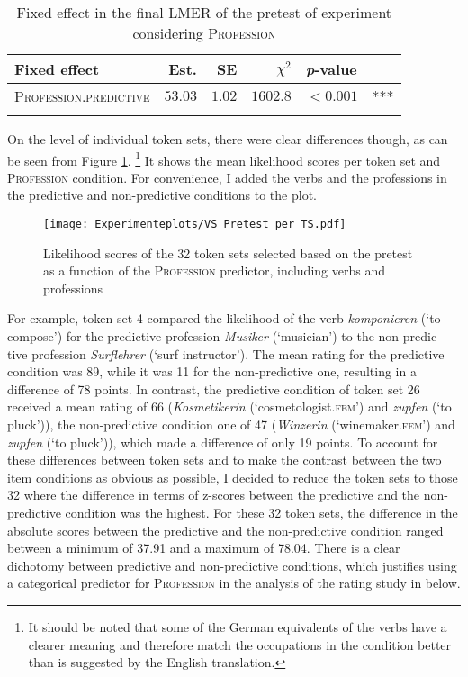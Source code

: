 \begin{table}
\caption{Fixed effect in the final LMER of the pretest of experiment  considering  \textsc{Profession}}
\centering
\begin{tabular}{lrrrll}
\lsptoprule
Fixed effect & Est. & SE & $\chi^2$ & \textit{p}-value &   \\
\midrule
\textsc{Profession.predictive} & $53.03$ & $1.02$ & $1602.8$ & $< 0.001$ & ***\\
\lspbottomrule
\end{tabular}
\label{tab:verb.surprisal.pretest.model.2}
\end{table}

\noindent
On the level of individual token sets, there were clear differences though, as can be seen from Figure \ref{fig:vt.pretest.results}.%
\footnote{It should be noted that some of the German equivalents of the verbs have a clearer meaning and therefore match the occupations in the condition better than is suggested by the English translation.}
%
It shows the mean likelihood scores per token set and \textsc{Profession} condition.
For convenience, I added the verbs and the professions in the predictive and non-predictive conditions to the plot.

\begin{figure}
\centering
\texttt{[image: Experimenteplots/VS\_Pretest\_per\_TS.pdf]}
\caption[Likelihood scores of the 32 token sets selected based on the pretest as a function of the \textsc{Profession} predictor, including verbs and professions]{Likelihood scores of the 32 token sets selected based on the pretest as a function of the \textsc{Profession} predictor, including verbs and professions}
\label{fig:vt.pretest.results}
\end{figure}

For example, token set 4 compared the likelihood of the verb \textit{komponieren} (`to compose') for the predictive profession \textit{Musiker} (`musician') to the non-predic- tive profession \textit{Surflehrer} (`surf instructor').
The mean rating for the predictive condition was 89, while it was 11 for the non-predictive one, resulting in a difference of 78 points.
In contrast, the predictive condition of token set 26 received a mean rating of 66 (\textit{Kosmetikerin} (`cosmetologist.\textsc{fem}') and \textit{zupfen} (`to pluck')), the non-predictive condition one of 47 (\textit{Winzerin} (`winemaker.\textsc{fem}') and \textit{zupfen} (`to pluck')), which made a difference of only 19 points.
To account for these differences between token sets and to make the contrast between the two item conditions as obvious as possible, I decided to reduce the token sets to those 32 where the difference in terms of z-scores between the predictive and the non-predictive condition was the highest.
For these 32 token sets, the difference in the absolute scores between the predictive and the non-predictive condition ranged between a minimum of 37.91 and a maximum of 78.04.
There is a clear dichotomy between predictive and non-predictive conditions, which justifies using a categorical predictor for \textsc{Profession} in the analysis of the rating study in  below.


